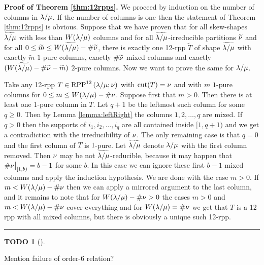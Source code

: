 \documentclass[numbers=enddot,12pt,final,onecolumn,notitlepage]{scrartcl}%
\theoremstyle{definition}
\newtheorem{quest}[theo]{TODO}
\newenvironment{todo}[1][]
{\begin{quest}[#1]\begin{leftbar}}
{\end{leftbar}\end{quest}}
\newenvironment{proof}[1][Proof]{\noindent\textbf{#1.} }{\ \rule{0.5em}{0.5em}}
\begin{document}
\begin{proof}[Proof of Theorem \ref{thm:12rpps}]
We proceed by induction on the number of columns in ${\lambda/\mu}$. If the number of columns is one then the statement of Theorem \ref{thm:12rpps} is obvious. Suppose that we have proven that for all skew-shapes $\widetilde{{\lambda/\mu}}$ with less than $W({\lambda/\mu})$ columns and for all $\widetilde{{\lambda/\mu}}$-irreducible partitions $\widetilde{{{\nu}}}$ and for all $0\leq \widetilde m\leq W(\widetilde{{\lambda/\mu}})-\#\widetilde{{{\nu}}}$, there is exactly one 12-rpp $\widetilde T$ of shape $\widetilde{{\lambda/\mu}}$ with exactly $\widetilde m$ $1$-pure columns, exactly $\#\widetilde{{{\nu}}}$ mixed columns and exactly $(W(\widetilde{{\lambda/\mu}})-\#\widetilde{{{\nu}}}-\widetilde m)$ $2$-pure columns. Now we want to prove the same for ${\lambda/\mu}$.

Take any 12-rpp $T\in{\operatorname*{RPP}^{12}\left( \lambda/\mu ;{{\nu}}\right)}$ with ${\operatorname*{cut}}(T)={{\nu}}$ and with $m$ $1$-pure columns for $0\leq m\leq W({\lambda/\mu})-\#{{\nu}}$. Suppose first that $m>0$. Then there is at least one $1$-pure column in $T$. Let $q+1$ be the leftmost such column for some $q\geq 0$. Then by Lemma \ref{lemma:leftRight} the columns $1,2,\dots,q$ are mixed. If $q>0$ then the supports of $i_1,i_2,\dots,i_q$ are all contained inside $[1,q+1)$ and we get a contradiction with the irreducibility of ${{\nu}}$. The only remaining case is that $q=0$ and the first column of $T$ is $1$-pure. Let $\widetilde{{\lambda/\mu}}$ denote ${\lambda/\mu}$ with the first column removed. Then ${{\nu}}$ may be not $\widetilde{{\lambda/\mu}}$-reducible, because it may happen that $\#{{{\nu}}\big|_{[1,b)}}=b-1$ for some $b$. In this case we can ignore these first $b-1$ mixed columns and apply the induction hypothesis. We are done with the case $m>0$. If $m<W({\lambda/\mu})-\#{{\nu}}$ then we can apply a mirrored argument to the last column, and it remains to note that for $W({\lambda/\mu})-\#{{\nu}}>0$ the cases $m>0$ and $m<W({\lambda/\mu})-\#{{\nu}}$ cover everything and for $W({\lambda/\mu})=\#{{\nu}}$ we get that $T$ is a 12-rpp with all mixed columns, but there is obviously a unique such 12-rpp.
\end{proof}




\begin{todo}
Mention failure of order-$6$ relation?
\end{todo}
\end{document}
